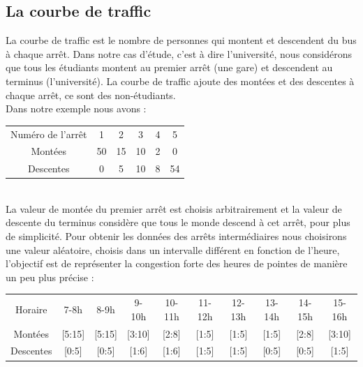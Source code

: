\documentclass[a4paper,11pt]{article}
\begin{document}
	\subsection{La courbe de traffic}
		La courbe de traffic est le nombre de personnes qui montent et descendent du bus à chaque arrêt. Dans notre cas d'étude, c'est à dire l'université, nous considérons que tous les étudiants montent au premier arrêt (une gare) et descendent au terminus (l'université). La courbe de traffic ajoute des montées et des descentes à chaque arrêt, ce sont des non-étudiants. \\
		Dans notre exemple nous avons : \\
		\begin{tabular}{ | c | c | c | c | c | c |}
 			\hline			
   			Numéro de l'arrêt & 1 & 2 & 3 & 4 & 5\\
   			Montées & 50 & 15 & 10 & 2 & 0 \\
   			Descentes & 0 & 5 & 10 & 8 & 54\\
 			\hline  
 		\end{tabular}\\
 		La valeur de montée du premier arrêt est choisis arbitrairement et la valeur de descente du terminus considère que tous le monde descend à cet arrêt, pour plus de simplicité. 
 		Pour obtenir les données des arrêts intermédiaires nous choisirons une valeur aléatoire, choisis dans un intervalle différent en fonction de l'heure, l'objectif est de représenter la congestion forte des heures de pointes de manière un peu plus précise : \\
 		\begin{tabular}{ | c | c | c | c | c | c | c | c | c | c |}
 			\hline			
   			Horaire & 7-8h & 8-9h & 9-10h & 10-11h & 11-12h & 12-13h & 13-14h & 14-15h & 15-16h\\
   			Montées & [5:15] & [5:15] & [3:10] & [2:8] & [1:5] & [1:5] & [1:5] & [2:8] & [3:10]\\
   			Descentes & [0:5] & [0:5] & [1:6] & [1:6] & [1:5] & [1:5] & [0:5] & [0:5] & [1:5]\\
 			\hline  
 		\end{tabular}\\
\end{document}
